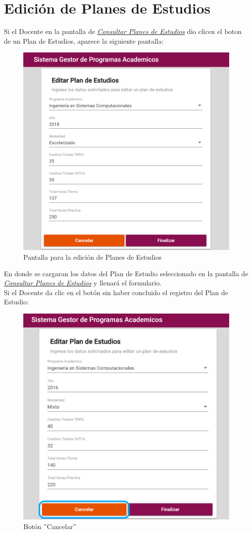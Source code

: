 \newpage
\section{Edición de Planes de Estudios}
Si el  Docente en la pantalla de \hyperlink{consultarPE}{\textit{Consultar Planes de Estudios}} dio clicen el boton  de un Plan de Estudios, aparece la siguiente pantalla:

\begin{figure}[!hbtp]
	\centering
	\hypertarget{editarPE}{\includegraphics[width=0.7\linewidth]{images/SP4-GPE/editarPE}}
	\caption{Pantalla para la edición de Planes de Estudios}
	\label{editarPE}
\end{figure}

En donde se cargaran los datos del Plan de Estudio seleccionado en la pantalla de \hyperlink{consultarPE}{\textit{Consultar Planes de Estudios}} y llenará el formulario.\\
\newpage
Si el Docente  da clic en el botón  sin haber concluido el registro del Plan de Estudio:

\begin{figure}[!hbtp]
	\centering
	\hypertarget{cancel2}{\includegraphics[width=0.7\linewidth]{images/SP4-GPE/cancelarPE}}
	\caption{Botón ''Cancelar''}
	\label{cancel2}
\end{figure}

